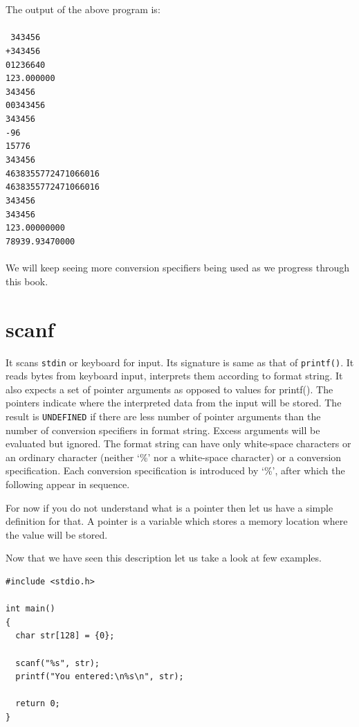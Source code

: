 The output of the above program is:
\\\\\texttt{ 343456\\
+343456\\
01236640\\
123.000000\\
343456\\
00343456\\
  343456\\
-96\\
15776\\
343456\\
4638355772471066016\\
4638355772471066016\\
343456\\
343456\\
123.00000000\\
78939.93470000\\\\}
We will keep seeing more conversion specifiers being used as we progress
through this book.

\section{scanf}
It scans \texttt{stdin} or keyboard for input. Its signature is same as that of
\texttt{printf()}. It reads bytes from keyboard input, interprets them
according to format string. It also expects a set of pointer arguments as
opposed to values for printf(). The pointers indicate where the interpreted
data from the input will be stored. The result is \texttt{UNDEFINED} if there
are less number of pointer arguments than the number of conversion specifiers in
format string. Excess arguments will be evaluated but ignored. The format
string can have only white-space characters or an ordinary character (neither
`\%' nor a white-space character) or a conversion specification. Each
conversion specification is introduced by `\%', after which the following
appear in sequence.

For now if you do not understand what is a pointer then let us have a simple
definition for that. A pointer is a variable which stores a memory location
where the value will be stored.

Now that we have seen this description let us take a look at few examples.

\begin{Verbatim}[frame=single]
#include <stdio.h>

int main()
{
  char str[128] = {0};

  scanf("%s", str);
  printf("You entered:\n%s\n", str);

  return 0;
}
\end{Verbatim}

